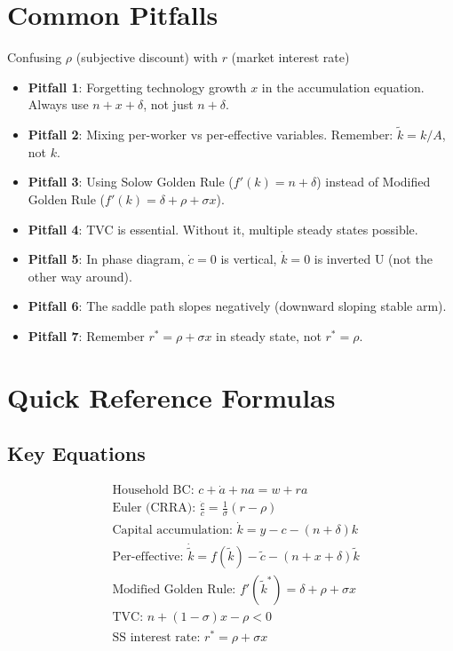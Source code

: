 \documentclass[a4paper,11pt]{article}
\newcommand{\ktilde}{\tilde{k}}
\newcommand{\ctilde}{\tilde{c}}
\begin{document}
\clearpage

\section*{Common Pitfalls}

\begin{warningbox}
Confusing $\rho$ (subjective discount) with $r$ (market interest rate)
\end{warningbox}

\begin{itemize}
    \item \textbf{Pitfall 1}: Forgetting technology growth $x$ in the accumulation equation. Always use $n + x + \delta$, not just $n + \delta$.
    
    \item \textbf{Pitfall 2}: Mixing per-worker vs per-effective variables. Remember: $\ktilde = k/A$, not $k$.
    
    \item \textbf{Pitfall 3}: Using Solow Golden Rule ($f'(k) = n + \delta$) instead of Modified Golden Rule ($f'(k) = \delta + \rho + \sigma x$).
    
    \item \textbf{Pitfall 4}: TVC is essential. Without it, multiple steady states possible.
    
    \item \textbf{Pitfall 5}: In phase diagram, $\dot{c}=0$ is vertical, $\dot{k}=0$ is inverted U (not the other way around).
    
    \item \textbf{Pitfall 6}: The saddle path slopes negatively (downward sloping stable arm).
    
    \item \textbf{Pitfall 7}: Remember $r^* = \rho + \sigma x$ in steady state, not $r^* = \rho$.
\end{itemize}

\clearpage

\section*{Quick Reference Formulas}

\subsection*{Key Equations}
\begin{align*}
&\text{Household BC: } c + \dot{a} + na = w + ra \\
&\text{Euler (CRRA): } \frac{\dot{c}}{c} = \frac{1}{\sigma}(r - \rho) \\
&\text{Capital accumulation: } \dot{k} = y - c - (n+\delta)k \\
&\text{Per-effective: } \dot{\ktilde} = f(\ktilde) - \ctilde - (n+x+\delta)\ktilde \\
&\text{Modified Golden Rule: } f'(\ktilde^*) = \delta + \rho + \sigma x \\
&\text{TVC: } n + (1-\sigma)x - \rho < 0 \\
&\text{SS interest rate: } r^* = \rho + \sigma x
\end{align*}
\end{document}
